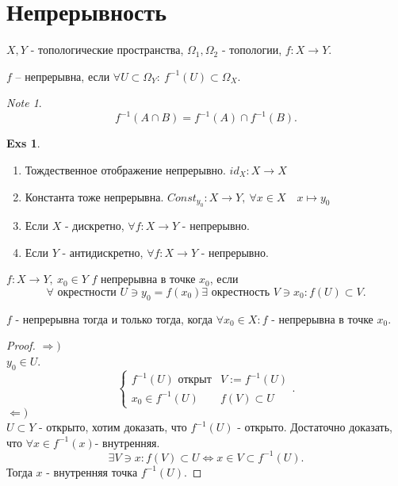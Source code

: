 \documentclass[11pt]{book}
\theoremstyle{definition}
\theoremstyle{plain}
\theoremstyle{plain}
\theoremstyle{definition}
\newtheorem*{exs}{Exs}
\theoremstyle{remark}
\newtheorem*{note}{Note}
\begin{document}
\section{Непрерывность}
$X, Y$ - топологические пространства, $\Omega_1, \Omega_2$ -  топологии, $f: X \to  Y$.
\begin{defn}
    $f$ -- непрерывна, если $\forall U \subset \Omega _Y: ~ f^{-1} (U)\subset \Omega_X$.
\end{defn}
\begin{note}
    \[
	f^{-1} (A \cap B) = f^{-1}(A) \cap f^{-1}(B)
    .\] 
\end{note}
\begin{exs}
    \begin{enumerate}
	\item Тождественное отображение непрерывно. $id_X : X \to  X$
	\item Константа тоже непрерывна. $Const_{y_0}:X \to Y, ~ \forall x \in  X \quad x\mapsto y_0 $
	\item Если $X$ - дискретно, $\forall f: X \to  Y$ - непрерывно.
	\item Если $Y$ - антидискретно, $\forall f: X \to  Y$ - непрерывно.
    \end{enumerate}
\end{exs}
\begin{defn}
    $f: X \to  Y, ~ x_0 \in Y$
    $f$ непрерывна в точке $ x_0$, если \[
	\forall \mbox{ окрестности } U \ni y_0 = f(x_0) \exists \mbox{ окрестность } V \ni x_0: f(U) \subset V
    .\] 
\end{defn}
\begin{thm}
    $f$ - непрерывна тогда и только тогда, когда $\forall x_0 \in  X: f$ - непрерывна в точке $x_0$.
\end{thm}
\begin{proof}
    $\Rightarrow )$\\
	$y_0 \in  U$.
	\[
	\left \{ 
	    \begin{array}{ll}
		f^{-1}(U) \mbox{ открыт} & V:=f^{-1}(U)\\
		x_0 \in f^{-1}(U) & f(V) \subset U
	        
	    \end{array}
	    \right .
	.\] 
	$\Leftarrow )$\\
	$U \subset Y$ - открыто, хотим доказать, что $f^{-1}(U)$ - открыто.
	Достаточно доказать, что $\forall x \in  f^{-1}(x) $- внутренняя.
	\[
	    \exists V \ni x: f(V)\subset U \Leftrightarrow x \in  V \subset f^{-1}(U)
	.\] 
	Тогда $x$ - внутренняя точка $f^{-1}(U)$.
\end{proof}
\end{document}
